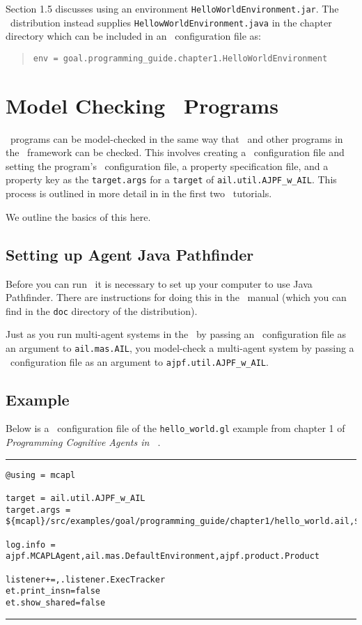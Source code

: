 \documentclass[a4]{article}
\begin{document}
Section 1.5 discusses using an environment \texttt{HelloWorldEnvironment.jar}.  The \mcapl\ distribution instead supplies \texttt{HellowWorldEnvironment.java} in the chapter directory which can be included in an \ail\ configuration file as:

\begin{quote}
  \texttt{env = goal.programming\_guide.chapter1.HelloWorldEnvironment}
\end{quote}

\section{Model Checking \goal\ Programs}

\goal\ programs can be model-checked in the same way that \gwendolen\ and other programs in the \ail\ framework can be checked.  This involves creating a \jpf\ configuration file and setting the program's \ail\ configuration file, a property specification file, and a property key as the \texttt{target.args} for a \texttt{target} of \texttt{ail.util.AJPF\_w\_AIL}.  This process is outlined in more detail in in the first two \ajpf\ tutorials.

We outline the basics of this here.

\subsection{Setting up Agent Java Pathfinder}
Before you can run \ajpf\ it is necessary to set up your computer to use Java Pathfinder.  There are instructions for doing this in the \mcapl\ manual (which you can find in the \texttt{doc} directory of the distribution).

Just as you run multi-agent systems in the \ail\ by passing an \ail\ configuration file as an argument to \texttt{ail.mas.AIL}, you model-check a multi-agent system by passing a \jpf\ configuration file as an argument to \texttt{ajpf.util.AJPF\_w\_AIL}.

\subsection{Example}
Below is a \jpf\ configuration file of the \texttt{hello\_world.gl} example from chapter 1 of \emph{Programming Cognitive Agents in \goal\ }.

\noindent\rule{\textwidth}{1pt}
\begin{small}
\begin{verbatim}
@using = mcapl

target = ail.util.AJPF_w_AIL
target.args = ${mcapl}/src/examples/goal/programming_guide/chapter1/hello_world.ail,${mcapl}/src/examples/goal/programming_guide/chapter1/simple.psl,1

log.info = ajpf.MCAPLAgent,ail.mas.DefaultEnvironment,ajpf.product.Product

listener+=,.listener.ExecTracker
et.print_insn=false
et.show_shared=false
\end{verbatim}
\end{small}
\rule{\textwidth}{1pt}
\end{document}
